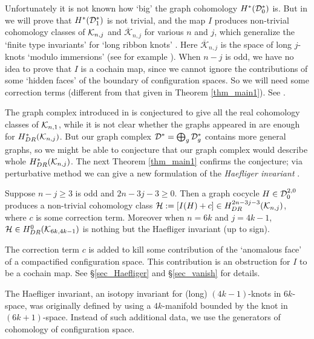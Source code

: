 Unfortunately it is not known how `big' the graph cohomology $H^* (\mathcal{D}^*_0 )$ is.
But in \cite{KWatanabe08} we will prove that $H^* (\mathcal{D}^*_1 )$ is not trivial, and the map $I$ produces non-trivial
cohomology classes of $\mathcal{K}_{n ,j}$ and $\overline{\mathcal{K}}_{n,j}$ for various $n$ and $j$, which generalize the
`finite type invariants' for `long ribbon knots' \cite{HabiroKanenobuShima99, Watanabe07}.
Here $\overline{\mathcal{K}}_{n,j}$ is the space of long $j$-knots `modulo immersions' (see for example
\cite{KWatanabe08, Sinha04}).
When $n-j$ is odd, we have no idea to prove that $I$ is a cochain map, since we cannot ignore the contributions of some
`hidden faces' of the boundary of configuration spaces.
So we will need some correction terms (different from that given in Theorem \ref{thm_main1}).
See \cite{KWatanabe08}.


The graph complex introduced in \cite{CCL02} is conjectured to give all the real cohomology classes of $\mathcal{K}_{n ,1}$,
while it is not clear whether the graphs appeared in \cite{CattaneoRossi05, Rossi_thesis, Watanabe07} are enough for
$H^*_{DR}(\mathcal{K}_{n ,j})$.
But our graph complex $\mathcal{D}^* =\bigoplus_g \mathcal{D}^*_g$ contains more general graphs, so we might be able to conjecture that
our graph complex would describe whole $H^*_{DR}(\mathcal{K}_{n ,j})$.
The next Theorem \ref{thm_main1} confirms the conjecture; via perturbative method we can give a new formulation of the
{\em Haefliger invariant} \cite{Haefliger62,Haefliger66}.



\begin{thm}\label{thm_main1}
Suppose $n-j \ge 3$ is odd and $2n-3j-3 \ge 0$.
Then a graph cocycle $H \in \mathcal{D}^{2,0}_0$ produces a non-trivial cohomology class
$\mathcal{H} :=[I(H)+c]\in H^{2n-3j-3}_{DR}(\mathcal{K}_{n ,j})$, where $c$ is some correction term.
Moreover when $n=6k$ and $j=4k-1$, $\mathcal{H} \in H^0_{DR}(\mathcal{K}_{6k ,4k-1})$ is nothing but the Haefliger invariant
(up to sign).
\end{thm}


The correction term $c$ is added to kill some contribution of the `anomalous face' of a compactified configuration space.
This contribution is an obstruction for $I$ to be a cochain map.
See \S \ref{sec_Haefliger} and \S \ref{sec_vanish} for details.


The Haefliger invariant, an isotopy invariant for (long) $(4k-1)$-knots in $6k$-space, was originally defined by
using  a $4k$-manifold bounded by the knot in $(6k+1)$-space.
Instead of such additional data, we use the generators of cohomology of configuration space.



